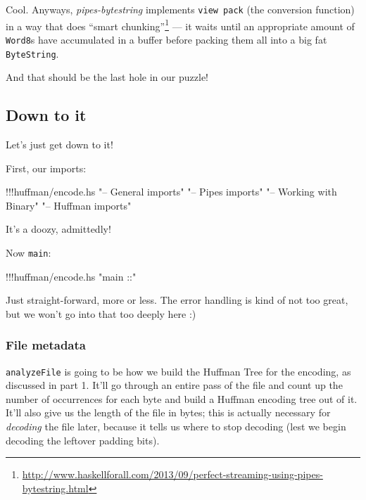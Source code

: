 \documentclass[]{article}
\newenvironment{Shaded}{}{}
\newcommand{\StringTok}[1]{\textcolor[rgb]{0.25,0.44,0.63}{{#1}}}
\newcommand{\FunctionTok}[1]{\textcolor[rgb]{0.02,0.16,0.49}{{#1}}}
\newcommand{\NormalTok}[1]{{#1}}
\renewcommand{\href}[2]{#2\footnote{\url{#1}}}
\begin{document}
Cool. Anyways, \emph{pipes-bytestring} implements \texttt{view\ pack}
(the conversion function) in a way that does
\href{http://www.haskellforall.com/2013/09/perfect-streaming-using-pipes-bytestring.html}{``smart
chunking''} --- it waits until an appropriate amount of \texttt{Word8}s
have accumulated in a buffer before packing them all into a big fat
\texttt{ByteString}.

And that should be the last hole in our puzzle!

\subsection{Down to it}\label{down-to-it}

Let's just get down to it!

First, our imports:

\begin{Shaded}
\begin{Highlighting}[]
\FunctionTok{!!!}\NormalTok{huffman}\FunctionTok{/}\NormalTok{encode}\FunctionTok{.}\NormalTok{hs }\StringTok{"-- General imports"} \StringTok{"-- Pipes imports"} \StringTok{"-- Working with Binary"} \StringTok{"-- Huffman imports"}
\end{Highlighting}
\end{Shaded}

It's a doozy, admittedly!

Now \texttt{main}:

\begin{Shaded}
\begin{Highlighting}[]
\FunctionTok{!!!}\NormalTok{huffman}\FunctionTok{/}\NormalTok{encode}\FunctionTok{.}\NormalTok{hs }\StringTok{"main ::"}
\end{Highlighting}
\end{Shaded}

Just straight-forward, more or less. The error handling is kind of not
too great, but we won't go into that too deeply here :)

\subsubsection{File metadata}\label{file-metadata}

\texttt{analyzeFile} is going to be how we build the Huffman Tree for
the encoding, as discussed in part 1. It'll go through an entire pass of
the file and count up the number of occurrences for each byte and build
a Huffman encoding tree out of it. It'll also give us the length of the
file in bytes; this is actually necessary for \emph{decoding} the file
later, because it tells us where to stop decoding (lest we begin
decoding the leftover padding bits).
\end{document}
